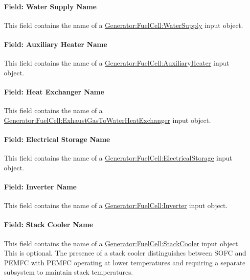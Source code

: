 \paragraph{Field: Water Supply Name}\label{field-water-supply-name}

This field contains the name of a \hyperref[generatorfuelcellwatersupply]{Generator:FuelCell:WaterSupply} input object.

\paragraph{Field: Auxiliary Heater Name}\label{field-auxiliary-heater-name}

This field contains the name of a \hyperref[generatorfuelcellauxiliaryheater]{Generator:FuelCell:AuxiliaryHeater} input object.

\paragraph{Field: Heat Exchanger Name}\label{field-heat-exchanger-name-000}

This field contains the name of a \hyperref[generator-fuelcell-exhaustgastowaterheatexchanger]{Generator:FuelCell:ExhaustGasToWaterHeatExchanger} input object.

\paragraph{Field: Electrical Storage Name}\label{field-electrical-storage-name}

This field contains the name of a \hyperref[generatorfuelcellelectricalstorage]{Generator:FuelCell:ElectricalStorage} input object.

\paragraph{Field: Inverter Name}\label{field-inverter-name}

This field contains the name of a \hyperref[generatorfuelcellinverter]{Generator:FuelCell:Inverter} input object.

\paragraph{Field: Stack Cooler Name}\label{field-stack-cooler-name}

This field contains the name of a \hyperref[generatorfuelcellstackcooler]{Generator:FuelCell:StackCooler} input object. This is optional. The presence of a stack cooler distinguishes between SOFC and PEMFC with PEMFC operating at lower temperatures and requiring a separate subsystem to maintain stack temperatures.

